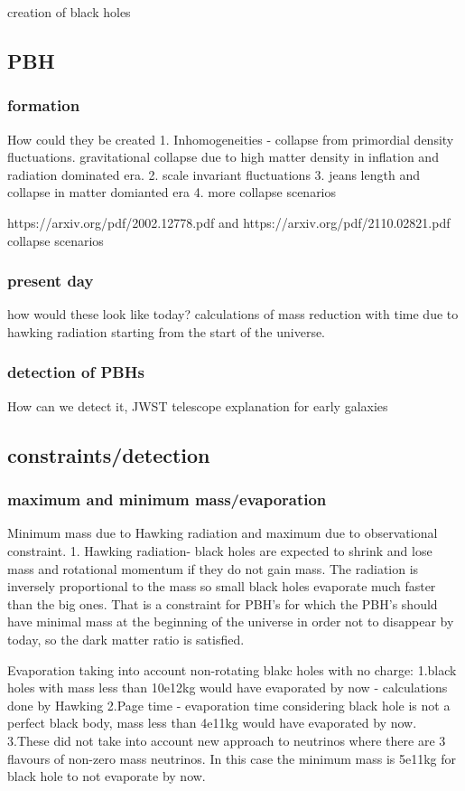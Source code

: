 \documentclass{article}
\begin{document}
creation of black holes 

\subsection {PBH}
\subsubsection {formation} How could they be created
1. Inhomogeneities - collapse from primordial density fluctuations. gravitational collapse due to high matter density in inflation and radiation dominated era.
2. scale invariant fluctuations 
3. jeans length and collapse in matter domianted era 
4. more collapse scenarios 

https://arxiv.org/pdf/2002.12778.pdf and https://arxiv.org/pdf/2110.02821.pdf    collapse scenarios 

\subsubsection {present day} how would these look like today? calculations of mass reduction with time due to hawking radiation starting from the start of the universe. 

\subsubsection {detection of PBHs} How can we detect it, JWST telescope explanation for early galaxies

\subsection {constraints/detection}
\subsubsection {maximum and minimum mass/evaporation}
Minimum mass due to Hawking radiation and maximum due to observational constraint.
1. Hawking radiation- black holes are expected to shrink and lose mass and rotational momentum if they do not gain mass. The radiation is inversely proportional to the mass so small black holes evaporate much faster than the big ones. That is a constraint for PBH's for which the PBH's should have minimal mass at the beginning of the universe in order not to disappear by today, so the dark matter ratio is satisfied. 

Evaporation taking into account non-rotating blakc holes with no charge:
1.black holes with mass less than 10e12kg would have evaporated by now - calculations done by Hawking 
2.Page time - evaporation time considering black hole is not a perfect black body, mass less than 4e11kg would have evaporated by now. 
3.These did not take into account new approach to neutrinos where there are 3 flavours of non-zero mass neutrinos. In this case the minimum mass is 5e11kg for black hole to not evaporate by now. 
\end{document}
